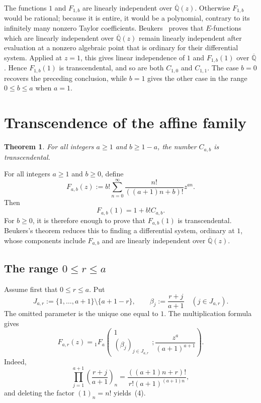 \documentclass[12pt]{article}
\newtheorem{theorem}{Theorem}
\begin{document}
The functions $1$ and $F_{1,b}$ are linearly independent over $\overline{\mathbb Q}(z)$. Otherwise $F_{1,b}$ would be rational; because it is entire, it would be a polynomial, contrary to its infinitely many nonzero Taylor coefficients. Beukers~\cite[Corollary~1.4]{beukers} proves that $E$-functions which are linearly independent over $\overline{\mathbb Q}(z)$ remain linearly independent after evaluation at a nonzero algebraic point that is ordinary for their differential system. Applied at $z=1$, this gives linear independence of $1$ and $F_{1,b}(1)$ over $\overline{\mathbb Q}$. Hence $F_{1,b}(1)$ is transcendental, and so are both $C_{1,0}$ and $C_{1,1}$. The case $b=0$ recovers the preceding conclusion, while $b=1$ gives the other case in the range $0\leq b\leq a$ when $a=1$.

\section{Transcendence of the affine family}
\label{sec:affine-family}

\begin{theorem}
\label{thm:main}
For all integers $a\geq1$ and $b\geq1-a$, the number $C_{a,b}$ is transcendental.
\end{theorem}

For all integers $a\geq1$ and $b\geq0$, define
\[
F_{a,b}(z):=b!\sum_{n=0}^{\infty}
\frac{n!}{((a+1)n+b)!}z^{an}.
\tag{2}
\]
Then
\[
F_{a,b}(1)=1+b!C_{a,b}.
\tag{3}
\]
For $b\geq0$, it is therefore enough to prove that $F_{a,b}(1)$ is transcendental. Beukers's theorem reduces this to finding a differential system, ordinary at $1$, whose components include $F_{a,b}$ and are linearly independent over $\overline{\mathbb Q}(z)$.

\subsection{The range \texorpdfstring{$0\leq r\leq a$}{0 <= r <= a}}
\label{sec:initial-range}

Assume first that $0\leq r\leq a$. Put
\[
J_{a,r}:=\{1,\ldots,a+1\}\setminus\{a+1-r\},
\qquad
\beta_j:=\frac{r+j}{a+1}\quad(j\in J_{a,r}).
\]
The omitted parameter is the unique one equal to $1$. The multiplication formula gives
\[
F_{a,r}(z)
={}_1F_a\!\left(
\begin{matrix}1\\(\beta_j)_{j\in J_{a,r}}\end{matrix};
\frac{z^a}{(a+1)^{a+1}}
\right).
\tag{4}
\]
Indeed,
\[
\prod_{j=1}^{a+1}
\left(\frac{r+j}{a+1}\right)_n
=\frac{((a+1)n+r)!}{r!(a+1)^{(a+1)n}},
\]
and deleting the factor $(1)_n=n!$ yields~(4).
\end{document}
